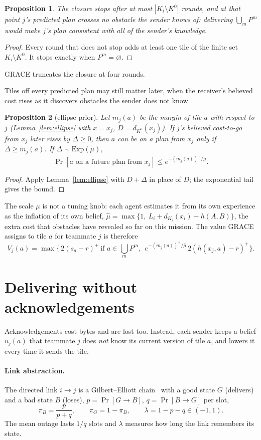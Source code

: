 \documentclass[11pt,a4paper]{article}
\newtheorem{proposition}{Proposition}
\theoremstyle{definition}
\newcommand{\pos}[1]{\left(#1\right)^{+}}
\begin{document}
\begin{proposition}\label{prop:closure}
The closure stops after at most $|K_i\setminus K^0|$ rounds, and at that point $j$'s predicted plan crosses no obstacle the sender knows of: delivering $\bigcup_mP^m$ would make $j$'s plan consistent with all of the sender's knowledge.
\end{proposition}
\begin{proof}
Every round that does not stop adds at least one tile of the finite set $K_i\setminus K^0$. It stops exactly when $P^m=\varnothing$.
\end{proof}
GRACE truncates the closure at four rounds.

Tiles off every predicted plan may still matter later, when the receiver's believed cost rises as it discovers obstacles the sender does not know.

\begin{proposition}[ellipse prior]\label{prop:prior}
Let $m_j(a)$ be the margin of tile $a$ with respect to $j$ (Lemma~\ref{lem:ellipse} with $x=x_j$, $D=d_{K^0}(x_j)$). If $j$'s believed cost-to-go from $x_j$ later rises by $\Delta\ge0$, then $a$ can be on a plan from $x_j$ only if $\Delta\ge m_j(a)$. If $\Delta\sim\mathrm{Exp}(\mu)$,
\[
\Pr[a\text{ on a future plan from }x_j]\le e^{-\pos{m_j(a)}/\mu}.
\]
\end{proposition}
\begin{proof}
Apply Lemma~\ref{lem:ellipse} with $D+\Delta$ in place of $D$; the exponential tail gives the bound.
\end{proof}
The scale $\mu$ is not a tuning knob: each agent estimates it from its own experience as the inflation of its own belief, $\hat\mu=\max\{1,\ L_i+d_{K_i}(x_i)-h(A,B)\}$, the extra cost that obstacles have revealed so far on this mission. The value GRACE assigns to tile $a$ for teammate $j$ is therefore
\[
V_j(a)=\max\Big\{\,2\pos{s_a-r}\ \text{if }a\in\textstyle\bigcup_mP^m,\ \ e^{-\pos{m_j(a)}/\hat\mu}\,2\pos{h(x_j,a)-r}\Big\}.
\]

\section{Delivering without acknowledgements}\label{sec:channel}

Acknowledgements cost bytes and are lost too. Instead, each sender keeps a belief $u_j(a)$ that teammate $j$ does \emph{not} know its current version of tile $a$, and lowers it every time it sends the tile.

\paragraph{Link abstraction.} The directed link $i\to j$ is a Gilbert--Elliott chain~\cite{gilbert60,elliott63} with a good state $G$ (delivers) and a bad state $B$ (loses), $p=\Pr[G\to B]$, $q=\Pr[B\to G]$ per slot,
\[
\pi_B=\frac{p}{p+q},\qquad \pi_G=1-\pi_B,\qquad \lambda=1-p-q\in(-1,1).
\]
The mean outage lasts $1/q$ slots and $\lambda$ measures how long the link remembers its state.
\end{document}
